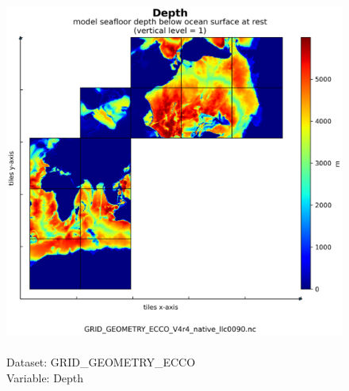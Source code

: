 \begin{figure}[H]
\centering
\includegraphics[scale=0.5]{../images/plots/native_plots_coords/Geometry_Parameters_for_the_Lat-Lon-Cap_90_(llc90)_Native_Model_Grid_(Version_4_Release_4)/Depth.png}
\caption{\\Dataset: GRID\_GEOMETRY\_ECCO\\Variable: Depth}
\label{tab:table-GRID_GEOMETRY_ECCO_Depth-Plot}
\end{figure}
\pagebreak
